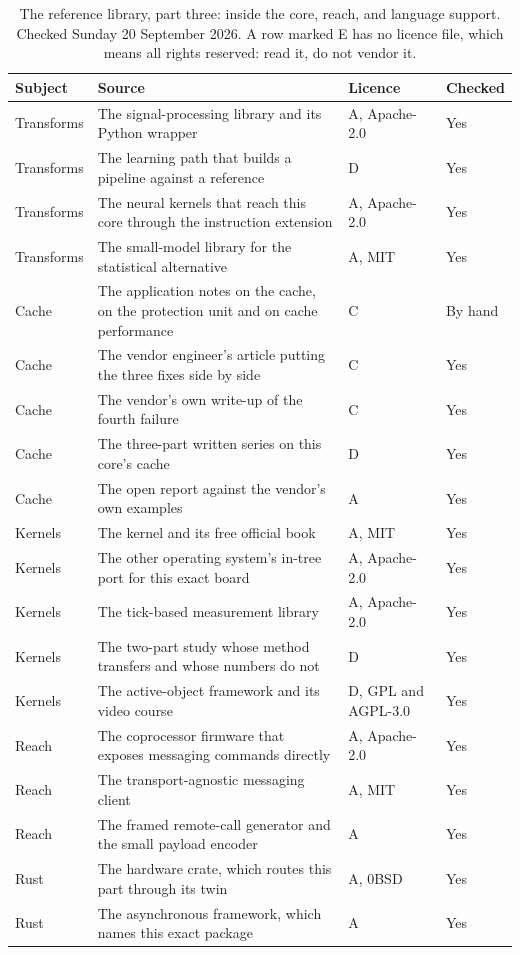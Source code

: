 \begin{table}[H]\centering\small
\begin{tabular}{p{28mm}p{80mm}p{22mm}p{18mm}}
\toprule
Subject & Source & Licence & Checked \\
\midrule
Transforms & The signal-processing library and its Python wrapper & A, Apache-2.0 & Yes \\
Transforms & The learning path that builds a pipeline against a reference & D & Yes \\
Transforms & The neural kernels that reach this core through the instruction extension & A, Apache-2.0 & Yes \\
Transforms & The small-model library for the statistical alternative & A, MIT & Yes \\
Cache & The application notes on the cache, on the protection unit and on cache performance & C & By hand \\
Cache & The vendor engineer's article putting the three fixes side by side & C & Yes \\
Cache & The vendor's own write-up of the fourth failure & C & Yes \\
Cache & The three-part written series on this core's cache & D & Yes \\
Cache & The open report against the vendor's own examples & A & Yes \\
Kernels & The kernel and its free official book & A, MIT & Yes \\
Kernels & The other operating system's in-tree port for this exact board & A, Apache-2.0 & Yes \\
Kernels & The tick-based measurement library & A, Apache-2.0 & Yes \\
Kernels & The two-part study whose method transfers and whose numbers do not & D & Yes \\
Kernels & The active-object framework and its video course & D, GPL and AGPL-3.0 & Yes \\
Reach & The coprocessor firmware that exposes messaging commands directly & A, Apache-2.0 & Yes \\
Reach & The transport-agnostic messaging client & A, MIT & Yes \\
Reach & The framed remote-call generator and the small payload encoder & A & Yes \\
Rust & The hardware crate, which routes this part through its twin & A, 0BSD & Yes \\
Rust & The asynchronous framework, which names this exact package & A & Yes \\
\bottomrule
\end{tabular}
\caption{The reference library, part three: inside the core, reach, and language support. Checked Sunday 20 September 2026. A row marked E has no licence file, which means all rights reserved: read it, do not vendor it.}
\end{table}

